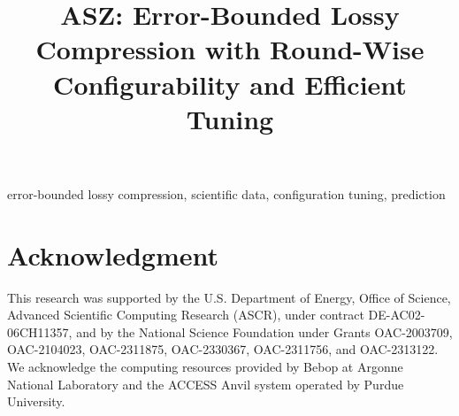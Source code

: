 \documentclass[conference]{IEEEtran}
\begin{document}
\title{ASZ: Error-Bounded Lossy Compression with Round-Wise Configurability and Efficient Tuning}

\author{
}

\maketitle



\begin{IEEEkeywords}
error-bounded lossy compression, scientific data, configuration tuning, prediction
\end{IEEEkeywords}












\section*{Acknowledgment}
This research was supported by the U.S. Department of Energy, Office of Science, Advanced Scientific Computing Research (ASCR), under contract DE-AC02-06CH11357, and by the National Science Foundation under Grants OAC-2003709, OAC-2104023, OAC-2311875, OAC-2330367, OAC-2311756, and OAC-2313122. We acknowledge the computing resources provided by Bebop at Argonne National Laboratory and the ACCESS Anvil system operated by Purdue University.



\end{document}
